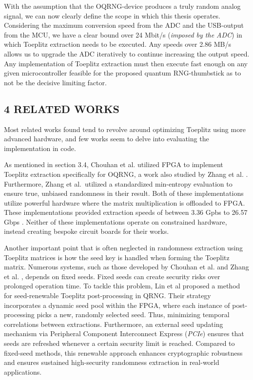 With the assumption that the OQRNG-device produces a truly random analog signal, we can now clearly define the scope in which this thesis operates. Considering the maximum conversion speed from the ADC and the USB-output from the MCU, we have a clear bound over 24 Mbit/s (\emph{imposed by the ADC}) in which Toeplitz extraction needs to be executed. Any speeds over 2.86 MB/s allows us to upgrade the ADC iteratively to continue increasing the output speed. Any implementation of Toeplitz extraction must then execute fast enough on any given microcontroller feasible for the proposed quantum RNG-thumbstick as to not be the decisive limiting factor.

\hypertarget{related-works}{%
\subsection{4 RELATED WORKS}\label{related-works}}

Most related works found tend to revolve around optimizing Toeplitz using more advanced hardware, and few works seem to delve into evaluating the implementation in code.

As mentioned in section 3.4, Chouhan et al. \cite{toeplitz-desc} utilized FPGA to implement Toeplitz extraction specifically for OQRNG, a work also studied by Zhang et al. \cite{toeplitz}. Furthermore, Zhang et al.~utilized a standardized min-entropy evaluation to ensure true, unbiased randomness in their result. Both of these implementations utilize powerful hardware where the matrix multiplication is offloaded to FPGA. These implementations provided extraction speeds of between 3.36 Gpbs \cite{toeplitz} to 26.57 Gbps \cite{toeplitz-desc}. Neither of these implementations operate on constrained hardware, instead creating bespoke circuit boards for their works.

Another important point that is often neglected in randomness extraction using Toeplitz matrices is how the seed key is handled when forming the Toeplitz matrix. Numerous systems, such as those developed by Chouhan et al. \cite{toeplitz-desc} and Zhang et al. \cite{toeplitz}, depends on fixed seeds. Fixed seeds can create security risks over prolonged operation time. To tackle this problem, Lin et al \cite{lin} proposed a method for seed-renewable Toeplitz post-processing in QRNG. Their strategy incorporates a dynamic seed pool within the FPGA, where each instance of post-processing picks a new, randomly selected seed. Thus, minimizing temporal correlations between extractions. Furthermore, an external seed updating mechanism via Peripheral Component Interconnect Express (\emph{PCIe}) ensures that seeds are refreshed whenever a certain security limit is reached. Compared to fixed-seed methods, this renewable approach enhances cryptographic robustness and ensures sustained high-security randomness extraction in real-world applications.

